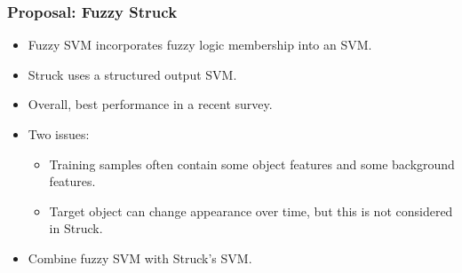 \begin{frame}
    \frametitle{Proposal: Fuzzy Struck}
    \begin{itemize}
        \item Fuzzy SVM incorporates fuzzy logic membership into an SVM. \cite{991432}
        \item Struck uses a structured output SVM. \cite{6126251} \cite{Schwenker2014}
        \item Overall, best performance in a recent survey. \cite{6671560}
        \item Two issues:
            \begin{itemize}
                \item Training samples often contain some object features and some background
                    features.
                \item Target object can change appearance over time, but this is not considered in
                    Struck.
            \end{itemize}
        \item Combine fuzzy SVM with Struck's SVM.
    \end{itemize}
\end{frame}
